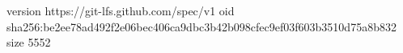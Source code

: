 version https://git-lfs.github.com/spec/v1
oid sha256:be2ee78ad492f2e06bec406ca9dbc3b42b098cfec9ef03f603b3510d75a8b832
size 5552
